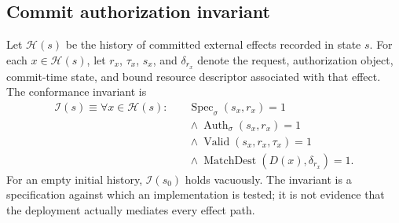 \documentclass[11pt,letterpaper]{article}
\begin{document}
\subsection{Commit authorization invariant}
Let $\mathcal{H}(s)$ be the history of committed external effects recorded in state $s$. For each $x\in\mathcal{H}(s)$, let $r_x$, $\tau_x$, $s_x$, and $\delta_{r_x}$ denote the request, authorization object, commit-time state, and bound resource descriptor associated with that effect. The conformance invariant is
\[
\begin{aligned}
\mathcal{I}(s)\equiv\forall x\in\mathcal{H}(s):\quad&
\operatorname{Spec}_{\sigma}(s_x,r_x)=1\\
&{}\land\operatorname{Auth}_{\sigma}(s_x,r_x)=1\\
&{}\land\operatorname{Valid}(s_x,r_x,\tau_x)=1\\
&{}\land\operatorname{MatchDest}(D(x),\delta_{r_x})=1.
\end{aligned}
\]
For an empty initial history, $\mathcal{I}(s_0)$ holds vacuously. The invariant is a specification against which an implementation is tested; it is not evidence that the deployment actually mediates every effect path.
\end{document}
